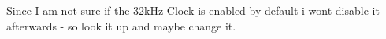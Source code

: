
\begin{DoxyRefList}
\item[\label{todo__todo000001}%
\hypertarget{todo__todo000001}{}%
Global \hyperlink{clock_8h_a23a363c676847b1b84e6149472897fa2}{set\+\_\+clock\+\_\+32\+M\+Hz} (void)]Since I am not sure if the 32k\+Hz Clock is enabled by default i wont disable it afterwards -\/ so look it up and maybe change it.
\end{DoxyRefList}